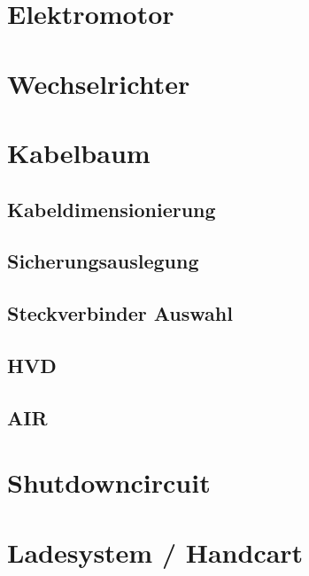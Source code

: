\section{Elektromotor}

\section{Wechselrichter}

\section{Kabelbaum}

\subsection{Kabeldimensionierung}

\subsection{Sicherungsauslegung}

\subsection{Steckverbinder Auswahl}

\subsection{HVD}

\subsection{AIR}

\section{Shutdowncircuit}

\section{Ladesystem / Handcart}

